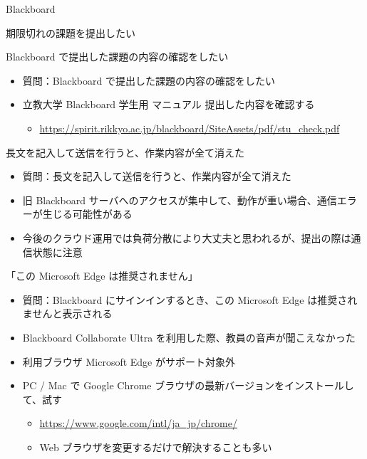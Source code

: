 \documentclass[a4j,10pt]{jsarticle}
\begin{document}
{\begin{frame}[label={sec:org166405d},fragile]{Blackboard}
\begin{block}{期限切れの課題を提出したい}
\begin{itemize}
\end{itemize}
\end{block}
\par
\begin{block}{Blackboard で提出した課題の内容の確認をしたい}
\begin{itemize}
\item 質問：Blackboard で提出した課題の内容の確認をしたい
\par
\item 立教大学 Blackboard 学生用 マニュアル 提出した内容を確認する
\begin{itemize}
\item \url{https://spirit.rikkyo.ac.jp/blackboard/SiteAssets/pdf/stu\_check.pdf}
\end{itemize}
\end{itemize}
\end{block}
\par
\begin{block}{長文を記入して送信を行うと、作業内容が全て消えた}
\begin{itemize}
\item 質問：長文を記入して送信を行うと、作業内容が全て消えた
\par
\item 旧 Blackboard サーバへのアクセスが集中して、動作が重い場合、通信エラーが生じる可能性がある
\item 今後のクラウド運用では負荷分散により大丈夫と思われるが、提出の際は通信状態に注意
\end{itemize}
\end{block}
\par
\begin{block}{「この Microsoft Edge は推奨されません」}
\begin{itemize}
\item 質問：Blackboard にサインインするとき、この Microsoft Edge は推奨されませんと表示される
\item Blackboard Collaborate Ultra を利用した際、教員の音声が聞こえなかった
\par
\item 利用ブラウザ Microsoft Edge がサポート対象外
\par
\item PC / Mac で Google Chrome ブラウザの最新バージョンをインストールして、試す
\begin{itemize}
\item \url{https://www.google.com/intl/ja\_jp/chrome/}
\item Web ブラウザを変更するだけで解決することも多い

\end{itemize}
\end{itemize}
\end{block}
\end{frame}}
\end{document}
